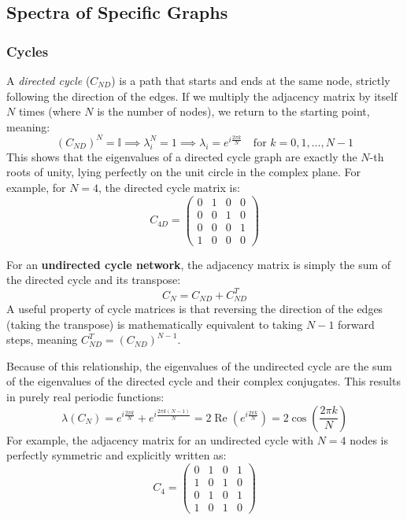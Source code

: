 \subsection{Spectra of Specific Graphs}

\subsubsection{Cycles}

A \textit{directed cycle} ($C_{ND}$) is a path that starts and ends at the same node, strictly following the direction of the edges. If we multiply the adjacency matrix by itself $N$ times (where $N$ is the number of nodes), we return to the starting point, meaning:
\[
    (C_{ND})^N = \mathbb{I} \implies \lambda_i^N = 1 \implies \lambda_i = e^{i\frac{2\pi k}{N}} \quad \text{for } k = 0, 1, \ldots, N-1
\]
This shows that the eigenvalues of a directed cycle graph are exactly the $N$-th roots of unity, lying perfectly on the unit circle in the complex plane. For example, for $N=4$, the directed cycle matrix is:
\[
    C_{4D} = \begin{pmatrix}
        0 & 1 & 0 & 0 \\
        0 & 0 & 1 & 0 \\
        0 & 0 & 0 & 1 \\
        1 & 0 & 0 & 0
    \end{pmatrix}
\]

For an \textbf{undirected cycle network}, the adjacency matrix is simply the sum of the directed cycle and its transpose:
\[
    C_N = C_{ND} + C_{ND}^T
\]
A useful property of cycle matrices is that reversing the direction of the edges (taking the transpose) is mathematically equivalent to taking $N-1$ forward steps, meaning $C_{ND}^T = (C_{ND})^{N-1}$.

Because of this relationship, the eigenvalues of the undirected cycle are the sum of the eigenvalues of the directed cycle and their complex conjugates. This results in purely real periodic functions:
\[
    \lambda(C_N) = e^{i\frac{2\pi k}{N}} + e^{i\frac{2\pi k (N-1)}{N}} = 2\operatorname{Re}\left(e^{i\frac{2\pi k}{N}}\right) = 2\cos\left(\frac{2\pi k}{N}\right)
\]
For example, the adjacency matrix for an undirected cycle with $N=4$ nodes is perfectly symmetric and explicitly written as:
\[
    C_4 = \begin{pmatrix}
        0 & 1 & 0 & 1 \\
        1 & 0 & 1 & 0 \\
        0 & 1 & 0 & 1 \\
        1 & 0 & 1 & 0
    \end{pmatrix}
\]

